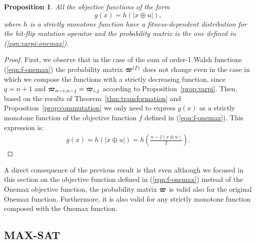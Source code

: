 \documentclass{article}
\newtheorem{proposition}{Proposition}
\def\vec#1{\mathchoice{\mbox{\boldmath$\displaystyle#1$}}
  {\mbox{\boldmath$\textstyle#1$}}
  {\mbox{\boldmath$\scriptstyle#1$}}
  {\mbox{\boldmath$\scriptscriptstyle#1$}}}
\begin{document}
\begin{proposition}
\label{prop:onemax-family}
All the objective functions of the form
\begin{equation}
\label{eqn:onemax-family}
g(x) = h(|x \oplus u|) ,
\end{equation}
where $h$ is a strictly monotone function have a fitness-dependent distribution for the bit-flip mutation operator and the probability matrix is the one defined in (\ref{eqn:varpi-onemax}).
\end{proposition}
\begin{proof}
First, we observe that in the case of the sum of order-1 Walsh functions (\ref{eqn:f-onemax}) the probability matrix $\vec{\varpi}^{(f)}$ does not change even in the case in which we compose the functions with a strictly decreasing function, since $q=n+1$ and $\vec{\varpi}_{n-i,n-j}=\vec{\varpi}_{i,j}$ according to Proposition~\ref{prop:varpi}. Then, based on the results of Theorem~\ref{thm:transformation} and Proposition~\ref{prop:commutation} we only need to express $g(x)$ as a strictly monotone function of the objective function $f$ defined in (\ref{eqn:f-onemax}). This expression is:
\begin{align}
g(x) = h(|x \oplus u|) = h\left(\frac{n-f(x \oplus u)}{2}\right) .
\end{align}
\end{proof}

A direct consequence of the previous result is that even although we focused in this section on the objective function defined in (\ref{eqn:f-onemax}) instead of the Onemax objective function, the probability matrix $\vec{\varpi}$ is valid also for the original Onemax function. Furthermore, it is also valid for any strictly monotone function composed with the Onemax function.




\subsection{MAX-SAT}
\label{subsec:max-sat}
\end{document}
